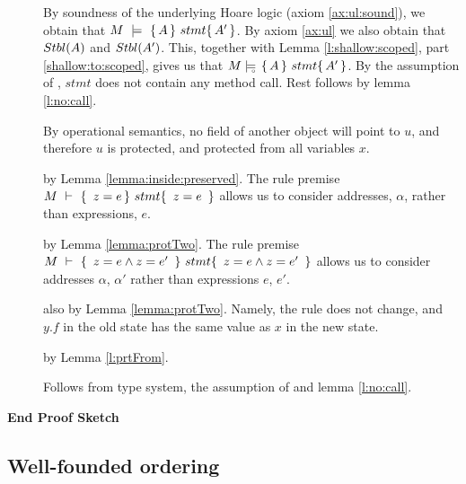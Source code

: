 \begin{description} 

\item[{}] 
By  soundness of the underlying Hoare logic (axiom \ref{ax:ul:sound}), we obtain that  $M\ \models\  \{\, A \, \}\ stmt \{\, A' \, \}$.
By axiom \ref{ax:ul} we also obtain that ${Stbl( A )}$ and  ${Stbl( A' )}$. 
This, together with   Lemma \ref{l:shallow:scoped}, part \ref{shallow:to:scoped}, gives us that
$M \models\!\!\!\!_{_{\circ}}\   \{\, A \, \}\ stmt \{\, A' \, \}  $. 
By the assumption of {}, $stmt$ does not contain any method call. Rest follows by lemma \ref{l:no:call}.

\item[{}] By operational semantics, no field of another object will point to $u$, and therefore $u$ is protected, and protected from all variables $x$.

\item[{}] by Lemma \ref{lemma:inside:preserved}. The rule premise
${\hproves{M}  	{\ z=e   } {\ stmt } {\ z=e\  }}$ allows us to consider addresses, $\alpha$,   rather than expressions, $e$.


\item[{}] by Lemma \ref{lemma:protTwo}. The rule premise
${M\ \vdash\ \{\,\ z=e \wedge z=e'\ \, \} \ stmt  \{\,\ z=e \wedge z=e'\ \, \}}$ allows us to consider addresses $\alpha$, $\alpha'$ rather than expressions $e$, $e'$.

\item[{}] also by Lemma \ref{lemma:protTwo}. Namely, the rule does not change, and $y.f$ in the old state has the same value as $x$ in the new state.

\item[{}] by Lemma \ref{l:prtFrom}.

\item[{}] 

Follows from type system, the assumption of {} and lemma \ref{l:no:call}.


\end{description}
\noindent
\vspace{.1cm}
{\textbf{End Proof Sketch}} 



\subsection{Well-founded ordering}

